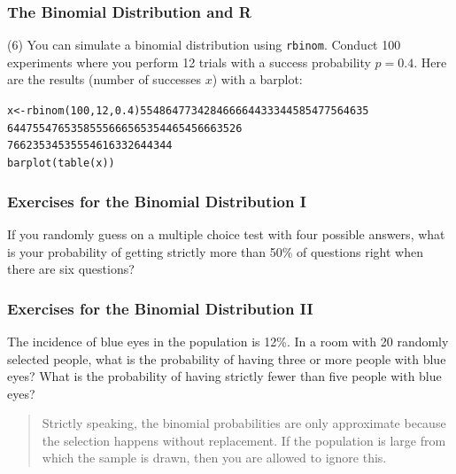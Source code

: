 \documentclass[xcolor=dvipsnames]{beamer}
\begin{document}
\begin{frame}
  \frametitle{The Binomial Distribution and R}
(6) You can simulate a binomial distribution using \texttt{rbinom}.
Conduct 100 experiments where you perform 12 trials with a success
probability $p=0.4$. Here are the results (number of successes $x$)
with a barplot:
\begin{alltt}
x<-rbinom(100,12,0.4) 5 5 4 8 6 4 7 7 3 4 2 8 4 6 6 6 6 4 4 3 3 3 4 4 5 8 5 4 7 7 5 6 4 6 3 5
6 4 4 7 5 5 4 7 6 5 3 5 8 5 5 5 6 6 6 5 6 5 3 5 4 4 6 5 4 5 6 6 6 3 5 2 6
7 6 6 2 3 5 3 4 5 3 5 5 5 4 6 1 6 3 3 2 6 4 4 3 4 4\newline
barplot(table(x))
\end{alltt}
\end{frame}

\begin{frame}
  \frametitle{Exercises for the Binomial Distribution I}
  {\ubung} If you randomly guess on a multiple choice test with four
  possible answers, what is your probability of getting strictly more than 50\%
  of questions right when there are six questions?
\end{frame}

\begin{frame}
  \frametitle{Exercises for the Binomial Distribution II}
  {\ubung} The incidence of blue eyes in the population is 12\%. In a room
  with 20 randomly selected people, what is the probability of having
  three or more people with blue eyes? What is the probability of
  having strictly fewer than five people with blue eyes? 
  \begin{quote}
    Strictly speaking, the binomial probabilities are only approximate
    because the selection happens without replacement. If the
    population is large from which the sample is drawn, then you are
    allowed to ignore this.
  \end{quote}
\end{frame}
\end{document}
